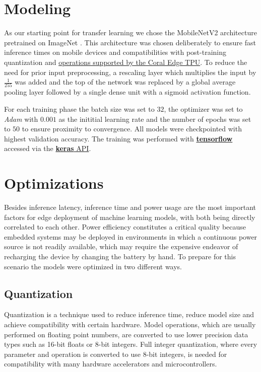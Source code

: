\documentclass[12pt,a4paper]{article}
\begin{document}
\section{Modeling}

As our starting point for transfer learning we chose the MobileNetV2 \cite{sandler2018mobilenetv2} architecture pretrained on ImageNet \cite{deng2009imagenet}. This architecture was chosen deliberately to ensure fast inference times on mobile devices and compatibilities with post-training quantization and \href{https://coral.ai/docs/edgetpu/models-intro/#supported-operations}{operations supported by the Coral Edge TPU}. To reduce the need for prior input preprocessing, a rescaling layer which multiplies the input by $\frac{1}{255}$ was added and the top of the network was replaced by a global average pooling layer followed by a single dense unit with a sigmoid activation function.

For each training phase the batch size was set to $32$, the optimizer was set to \textit{Adam} \cite{kingma2014adam} with $0.001$ as the inititial learning rate and the number of epochs was set to $50$ to ensure proximity to convergence. All models were checkpointed with highest validation accuracy. The training was performed with \href{https://github.com/tensorflow/tensorflow}{\textbf{tensorflow}} accessed via the \href{https://keras.io/api/}{\textbf{keras} API}.

\section{Optimizations}

Besides inference latency, inference time and power usage are the most important factors for edge deployment of machine learning models, with both being directly correlated to each other. Power efficiency constitutes a critical quality because embedded systems may be deployed in environments in which a continuous power source is not readily available, which may require the expensive endeavor of recharging the device by changing the battery by hand. To prepare for this scenario the models were optimized in two different ways.

\subsection{Quantization}

Quantization is a technique used to reduce inference time, reduce model size and achieve compatibility with certain hardware. Model operations, which are usually performed on floating point numbers, are converted to use lower precision data types such as 16-bit floats or 8-bit integers. Full integer quantization, where every parameter and operation is converted to use 8-bit integers, is needed for compatibility with many hardware accelerators and microcontrollers. 
\end{document}
